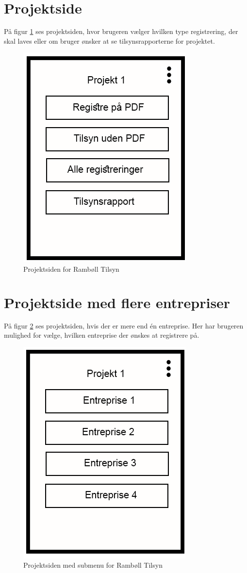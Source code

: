 \section{Projektside}\label{sec:ProjektsideMock}
På figur \ref{fig:ProjektsideMock} ses projektsiden, hvor brugeren vælger hvilken type registrering, der skal laves eller om bruger ønsker at se tilsynsrapporterne for projektet.

\begin{figure}[H]
	\centering
	\includegraphics[width=0.4\linewidth]{MockUps/Mock/Ramboell-Registrer}
	\caption{Projektsiden for Rambøll Tilsyn}
	\label{fig:ProjektsideMock}
\end{figure}

\clearpage

\section{Projektside med flere entrepriser}\label{sec:ProjektsideEntrepriseMock}
På figur \ref{fig:ProjektsideEntrepriseMock} ses projektsiden, hvis der er mere end én entreprise. Her har brugeren mulighed for vælge, hvilken entreprise der ønskes at registrere på.

\begin{figure}[H]
	\centering
	\includegraphics[width=0.4\linewidth]{MockUps/Mock/Ramboell-Entreprise}
	\caption{Projektsiden med submenu for Rambøll Tilsyn}
	\label{fig:ProjektsideEntrepriseMock}
\end{figure}

